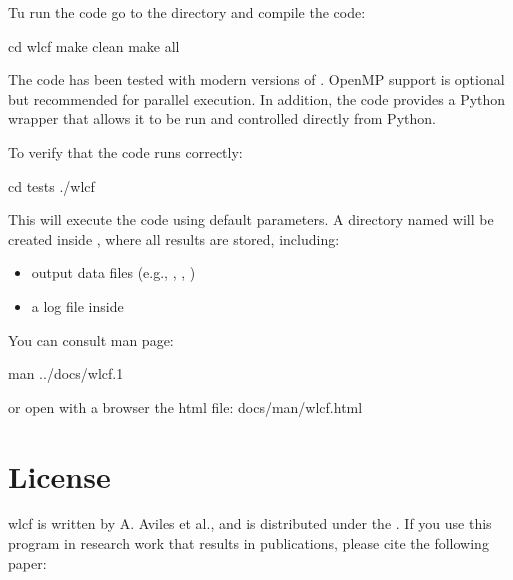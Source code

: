 \documentclass[letterpaper,10pt,english]{sphinxmanual}
\begin{document}
\sphinxAtStartPar
Tu run the code go to the  directory and compile the code:

\begin{sphinxVerbatim}[commandchars=\\\{\}]
\PYGZdl{} cd wlcf
\PYGZdl{} make clean
\PYGZdl{} make all
\end{sphinxVerbatim}

\sphinxAtStartPar
The code has been tested with modern versions of . OpenMP support is optional but recommended for parallel execution. In addition, the code provides a Python wrapper that allows it to be run and controlled directly from Python.

\sphinxAtStartPar
To verify that the code runs correctly:

\begin{sphinxVerbatim}[commandchars=\\\{\}]
\PYGZdl{} cd tests
\PYGZdl{} ./wlcf
\end{sphinxVerbatim}

\sphinxAtStartPar
This will execute the code using default parameters. A directory named  will be created inside , where all results are stored, including:
\begin{itemize}
\item {} 
\sphinxAtStartPar
output data files (e.g., , , )

\item {} 
\sphinxAtStartPar
a log file inside 

\end{itemize}

\sphinxAtStartPar
You can consult man page:

\begin{sphinxVerbatim}[commandchars=\\\{\}]
\PYGZdl{} man ../docs/wlcf.1
\end{sphinxVerbatim}

\sphinxAtStartPar
or open with a browser the html file: docs/man/wlcf.html


\section{License}
\label{\detokenize{overview:license}}
\sphinxAtStartPar
wlcf is written by A. Aviles et al., and is distributed under the . If you use this program in research work that results in publications, please cite the following paper:
\end{document}
